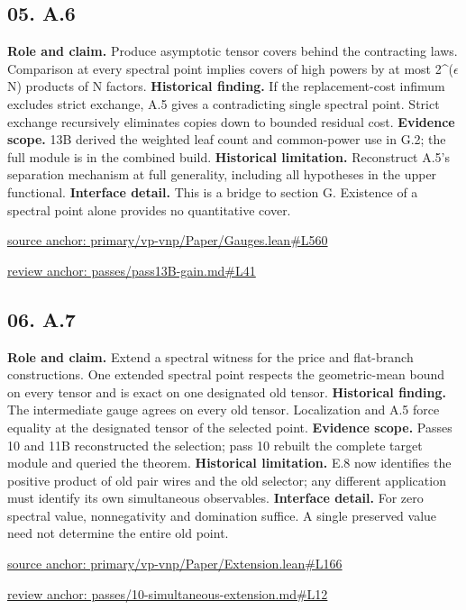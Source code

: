 \documentclass[11pt,letterpaper]{article}
\theoremstyle{definition}\newtheorem{definition}[theorem]{Definition}\newtheorem{example}[theorem]{Example}
\theoremstyle{remark}\newtheorem{remark}[theorem]{Remark}
\begin{document}
\subsection*{05. A.6}
\textbf{Role and claim.} Produce asymptotic tensor covers behind the contracting laws. Comparison at every spectral point implies covers of high powers by at most 2\textasciicircum{}(\ensuremath{\epsilon}N) products of N factors.
\textbf{Historical finding.} If the replacement-cost infimum excludes strict exchange, A.5 gives a contradicting single spectral point. Strict exchange recursively eliminates copies down to bounded residual cost.
\textbf{Evidence scope.} 13B derived the weighted leaf count and common-power use in G.2; the full module is in the combined build.
\textbf{Historical limitation.} Reconstruct A.5's separation mechanism at full generality, including all hypotheses in the upper functional.
\textbf{Interface detail.} This is a bridge to section G. Existence of a spectral point alone provides no quantitative cover.
\par\href{https://github.com/nousentllc/VP-VNP-Review/blob/8a7976933b6b2b4ffda1ad3a0dfb5fc6b6f023e8/primary/vp-vnp/Paper/Gauges.lean\#L560}{source anchor: primary/vp-vnp/Paper/Gauges.lean\#L560}
\par\href{https://github.com/nousentllc/VP-VNP-Review/blob/8a7976933b6b2b4ffda1ad3a0dfb5fc6b6f023e8/passes/pass13B-gain.md\#L41}{review anchor: passes/pass13B-gain.md\#L41}
\goodbreak
{}
\hypertarget{claim.06}{}
\subsection*{06. A.7}
\textbf{Role and claim.} Extend a spectral witness for the price and flat-branch constructions. One extended spectral point respects the geometric-mean bound on every tensor and is exact on one designated old tensor.
\textbf{Historical finding.} The intermediate gauge agrees on every old tensor. Localization and A.5 force equality at the designated tensor of the selected point.
\textbf{Evidence scope.} Passes 10 and 11B reconstructed the selection; pass 10 rebuilt the complete target module and queried the theorem.
\textbf{Historical limitation.} E.8 now identifies the positive product of old pair wires and the old selector; any different application must identify its own simultaneous observables.
\textbf{Interface detail.} For zero spectral value, nonnegativity and domination suffice. A single preserved value need not determine the entire old point.
\par\href{https://github.com/nousentllc/VP-VNP-Review/blob/8a7976933b6b2b4ffda1ad3a0dfb5fc6b6f023e8/primary/vp-vnp/Paper/Extension.lean\#L166}{source anchor: primary/vp-vnp/Paper/Extension.lean\#L166}
\par\href{https://github.com/nousentllc/VP-VNP-Review/blob/8a7976933b6b2b4ffda1ad3a0dfb5fc6b6f023e8/passes/10-simultaneous-extension.md\#L12}{review anchor: passes/10-simultaneous-extension.md\#L12}
\goodbreak
{}
\hypertarget{claim.07}{}
\end{document}
